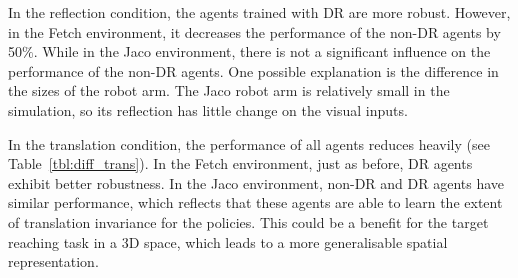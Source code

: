 In the reflection condition, the agents trained with DR are more robust. However, in the Fetch environment, it decreases the performance of the non-DR agents by 50$\%$. While in the Jaco environment, there is not a significant influence on the performance of the non-DR agents. One possible explanation is the difference in the sizes of the robot arm. The Jaco robot arm is relatively small in the simulation, so its reflection has little change on the visual inputs.

In the translation condition, the performance of all agents reduces heavily (see Table~\ref{tbl:diff_trans}). In the Fetch environment, just as before, DR agents exhibit better robustness. In the Jaco environment, non-DR and DR agents have similar performance, which reflects that these agents are able to learn the extent of translation invariance for the policies. This could be a benefit for the target reaching task in a 3D space, which leads to a more generalisable spatial representation.

\begin{table}[H]
  \caption{Test performance of all models with different levels of camera translation. Checkmarks and crosses indicate enabling/disabling DR and proprioceptive inputs (Prop.), respectively. Mean $\pm$ standard error are calculated over all models (seeds) and test target locations.}
  \label{tbl:diff_trans}
\end{table}


